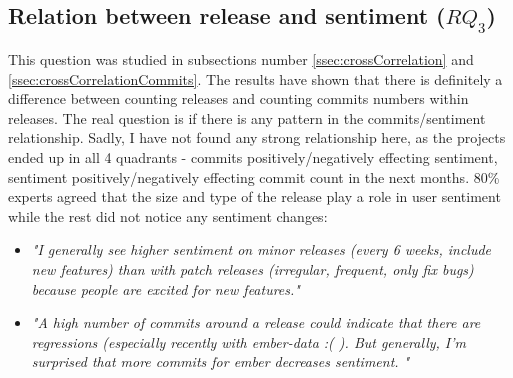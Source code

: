 \subsection{Relation between release and sentiment ($RQ_{3}$)}
This question was studied in subsections number \ref{ssec:crossCorrelation} and \ref{ssec:crossCorrelationCommits}. The results have shown that there is definitely a difference between counting releases and counting commits numbers within releases. The real question is if there is any pattern in the commits/sentiment relationship. Sadly, I have not found any strong relationship here, as the projects ended up in all 4 quadrants - commits positively/negatively effecting sentiment, sentiment positively/negatively effecting commit count in the next months. 80\% experts agreed that the size and type of the release play a role in user sentiment while the rest did not notice any sentiment changes:
\begin{itemize}
\item \textit{"I generally see higher sentiment on minor releases (every 6 weeks, include new features) than with patch releases (irregular, frequent, only fix bugs) because people are excited for new features."}
\item \textit{"A high number of commits around a release could indicate that there are regressions (especially recently with ember-data :( ). But generally, I'm surprised that more commits for ember decreases sentiment. "}
\end{itemize}

